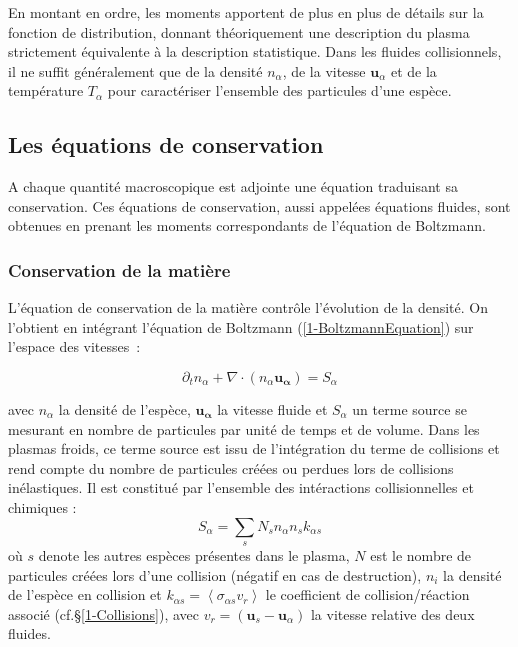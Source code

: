 \begin{refsection}
En montant en ordre, les moments apportent de plus en plus de détails sur la
fonction de distribution, donnant théoriquement une description du plasma
strictement équivalente à la description statistique. Dans les fluides
collisionnels, il ne suffit généralement que de la densité $n_\alpha$, de la
vitesse $\mathbf{u}_\alpha$ et de la température $T_\alpha$ pour caractériser
l'ensemble des particules d'une espèce.



\subsection{Les équations de conservation}

A chaque quantité macroscopique est adjointe une équation traduisant sa
conservation. Ces équations de conservation, aussi appelées équations fluides,
sont obtenues en prenant les moments correspondants de l'équation de Boltzmann.

\subsubsection{Conservation de la matière}
L'équation de conservation de la matière contrôle
l'évolution de la densité. On l'obtient en intégrant
l'équation de Boltzmann (\eqref{1-BoltzmannEquation}) sur l'espace des
vitesses~:

\begin{equation}
\label{1-eqContinuite}
	\partial_tn_\alpha+
	\nabla\cdot\left(n_\alpha\mathbf{u_\alpha}\right)=S_\alpha
\end{equation}

avec $n_\alpha$ la densité de l'espèce, $\mathbf{u_\alpha}$ la vitesse
fluide et $S_\alpha$ un terme source se mesurant en nombre de particules par
unité de temps et de volume. Dans les plasmas froids, ce terme source est issu
de l'intégration du terme de collisions et rend compte du nombre de particules
créées ou perdues lors de collisions inélastiques. Il est constitué
par l'ensemble des intéractions collisionnelles et chimiques :
$$S_\alpha=\sum_s N_s n_{\alpha}n_{s}k_{\alpha s}$$ où $s$ denote les autres
espèces présentes dans le plasma, $N$ est le nombre de particules créées lors
d'une collision (négatif en cas de destruction), $n_i$ la densité de l'espèce en collision et $k_{\alpha s}=\left<\sigma_{\alpha s}
v_r\right>$ le coefficient de collision/réaction
associé (cf.\S\ref{1-Collisions}), avec $v_r=(\mathbf u_s-\mathbf u_\alpha)$
la vitesse relative des deux fluides.


\end{refsection}
